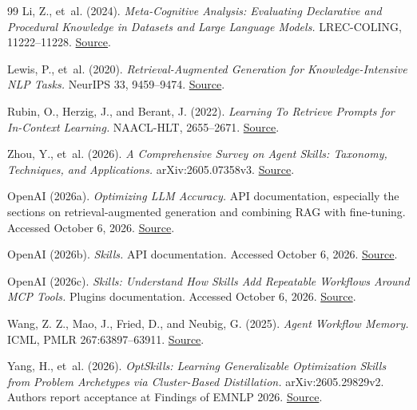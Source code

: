 \documentclass[11pt]{article}
\begin{document}
\begin{thebibliography}{99}
Li, Z., et~al. (2024). \emph{Meta-Cognitive Analysis: Evaluating Declarative and Procedural Knowledge in Datasets and Large Language Models.} LREC-COLING, 11222--11228. \href{https://aclanthology.org/2024.lrec-main.980/}{Source}.

Lewis, P., et~al. (2020). \emph{Retrieval-Augmented Generation for Knowledge-Intensive NLP Tasks.} NeurIPS 33, 9459--9474. \href{https://proceedings.neurips.cc/paper/2020/hash/6b493230205f780e1bc26945df7481e5-Abstract.html}{Source}.

Rubin, O., Herzig, J., and Berant, J. (2022). \emph{Learning To Retrieve Prompts for In-Context Learning.} NAACL-HLT, 2655--2671. \href{https://aclanthology.org/2022.naacl-main.191/}{Source}.

Zhou, Y., et~al. (2026). \emph{A Comprehensive Survey on Agent Skills: Taxonomy, Techniques, and Applications.} arXiv:2605.07358v3. \href{https://arxiv.org/abs/2605.07358v3}{Source}.

OpenAI (2026a). \emph{Optimizing LLM Accuracy.} API documentation, especially the sections on retrieval-augmented generation and combining RAG with fine-tuning. Accessed October 6, 2026. \href{https://developers.openai.com/api/docs/guides/optimizing-llm-accuracy}{Source}.

OpenAI (2026b). \emph{Skills.} API documentation. Accessed October 6, 2026. \href{https://developers.openai.com/api/docs/guides/tools-skills}{Source}.

OpenAI (2026c). \emph{Skills: Understand How Skills Add Repeatable Workflows Around MCP Tools.} Plugins documentation. Accessed October 6, 2026. \href{https://developers.openai.com/plugins/concepts/skills}{Source}.

Wang, Z. Z., Mao, J., Fried, D., and Neubig, G. (2025). \emph{Agent Workflow Memory.} ICML, PMLR 267:63897--63911. \href{https://proceedings.mlr.press/v267/wang25bx.html}{Source}.

Yang, H., et~al. (2026). \emph{OptSkills: Learning Generalizable Optimization Skills from Problem Archetypes via Cluster-Based Distillation.} arXiv:2605.29829v2. Authors report acceptance at Findings of EMNLP 2026. \href{https://arxiv.org/abs/2605.29829v2}{Source}.

\end{thebibliography}
\end{document}
